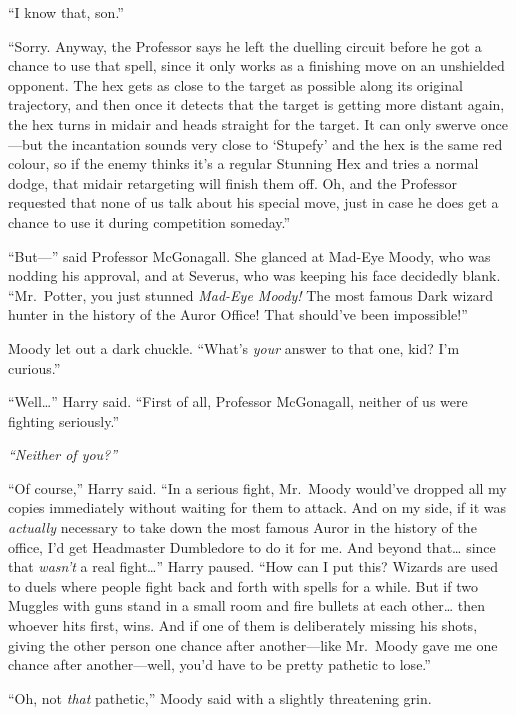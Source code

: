 ``I know that, son.''

``Sorry. Anyway, the Professor says he left the duelling circuit before
he got a chance to use that spell, since it only works as a finishing
move on an unshielded opponent. The hex gets as close to the target as
possible along its original trajectory, and then once it detects that
the target is getting more distant again, the hex turns in midair and
heads straight for the target. It can only swerve once---but the
incantation sounds very close to `Stupefy' and the hex is the same red
colour, so if the enemy thinks it's a regular Stunning Hex and tries a
normal dodge, that midair retargeting will finish them off. Oh, and the
Professor requested that none of us talk about his special move, just in
case he does get a chance to use it during competition someday.''

``But---'' said Professor McGonagall. She glanced at Mad-Eye Moody, who
was nodding his approval, and at Severus, who was keeping his face
decidedly blank. ``Mr.~Potter, you just stunned \emph{Mad-Eye Moody!}
The most famous Dark wizard hunter in the history of the Auror Office!
That should've been impossible!''

Moody let out a dark chuckle. ``What's \emph{your} answer to that one,
kid? I'm curious.''

``Well\ldots{}'' Harry said. ``First of all, Professor McGonagall,
neither of us were fighting seriously.''

\emph{``Neither of you?''}

``Of course,'' Harry said. ``In a serious fight, Mr.~Moody would've
dropped all my copies immediately without waiting for them to attack.
And on my side, if it was \emph{actually} necessary to take down the
most famous Auror in the history of the office, I'd get Headmaster
Dumbledore to do it for me. And beyond that\ldots{} since that
\emph{wasn't} a real fight\ldots{}'' Harry paused. ``How can I put this?
Wizards are used to duels where people fight back and forth with spells
for a while. But if two Muggles with guns stand in a small room and fire
bullets at each other\ldots{} then whoever hits first, wins. And if one
of them is deliberately missing his shots, giving the other person one
chance after another---like Mr.~Moody gave me one chance after
another---well, you'd have to be pretty pathetic to lose.''

``Oh, not \emph{that} pathetic,'' Moody said with a slightly threatening
grin.

